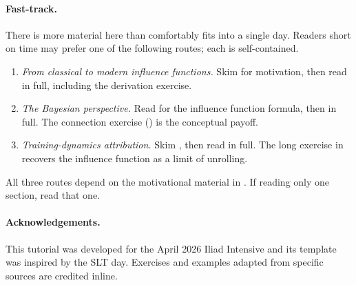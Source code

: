 \paragraph{Fast-track.} There is more material here than comfortably fits into a single day. Readers short on time may prefer one of the following routes; each is self-contained.
\begin{enumerate}[label=\textbf{Route \arabic*.}, leftmargin=*]
  \item \emph{From classical to modern influence functions.} Skim  for motivation, then read  in full, including the derivation exercise.
  \item \emph{The Bayesian perspective.} Read  for the influence function formula, then  in full. The connection exercise () is the conceptual payoff.
  \item \emph{Training-dynamics attribution.} Skim , then read  in full. The long exercise in  recovers the influence function as a limit of unrolling.
\end{enumerate}
All three routes depend on the motivational material in . If reading only one section, read that one.

\paragraph{Acknowledgements.} This tutorial was developed for the April 2026 Iliad Intensive and its template was inspired by the SLT day. 
Exercises and examples adapted from specific sources are credited inline.
